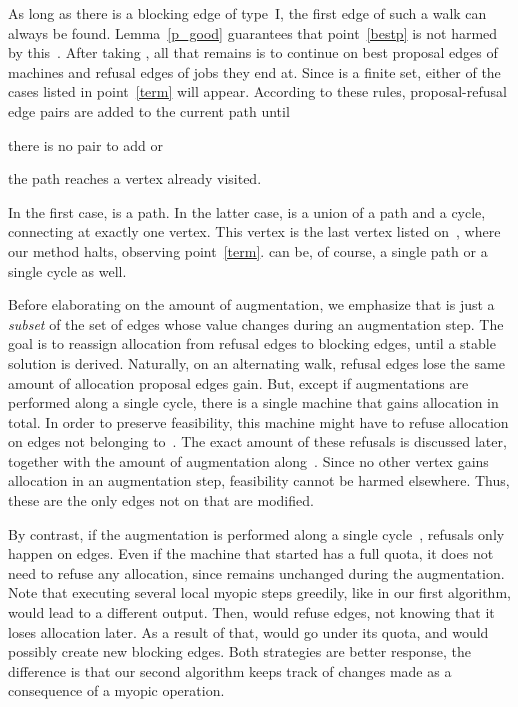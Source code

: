 \documentclass{llncs}
\begin{document}
As long as there is a blocking edge of type~I, the first edge  of such a walk can always be found. Lemma~\ref{p_good} guarantees that point~\ref{bestp} is not harmed by this~. After taking , all that remains is to continue on best proposal edges of machines and refusal edges of jobs they end at. Since  is a finite set, either of the cases listed in point~\ref{term} will appear. According to these rules, proposal-refusal edge pairs are added to the current path until \begin{inparaenum}[1)]
	\item there is no pair to add or 
	\item the path reaches a vertex already visited. \end{inparaenum} In the first case,  is a path. In the latter case,  is a union of a path and a cycle, connecting at exactly one vertex. This vertex is the last vertex listed on~, where our method halts, observing point~\ref{term}.  can be, of course, a single path or a single cycle as well.
	


	Before elaborating on the amount of augmentation, we emphasize that  is just a \emph{subset} of the set of edges whose  value changes during an augmentation step. The goal is to reassign allocation from refusal edges to blocking edges, until a stable solution is derived. Naturally, on an alternating walk, refusal edges lose the same amount of allocation proposal edges gain. But, except if augmentations are performed along a single cycle, there is a single machine  that gains allocation in total. In order to preserve feasibility, this machine might have to refuse allocation on edges not belonging to~. The exact amount of these refusals is discussed later, together with the amount of augmentation along~. Since no other vertex gains allocation in an augmentation step, feasibility cannot be harmed elsewhere. Thus, these are the only edges not on  that are modified.
	
	 By contrast, if the augmentation is performed along a single cycle~, refusals only happen on  edges. Even if the machine  that started  has a full quota, it does not need to refuse any allocation, since  remains unchanged during the augmentation. Note that executing several local myopic steps greedily, like in our first algorithm, would lead to a different output. Then,  would refuse edges, not knowing that it loses allocation later. As a result of that,  would go under its quota, and would possibly create new blocking edges. Both strategies are better response, the difference is that our second algorithm keeps track of changes made as a consequence of a myopic operation.	
\end{document}
